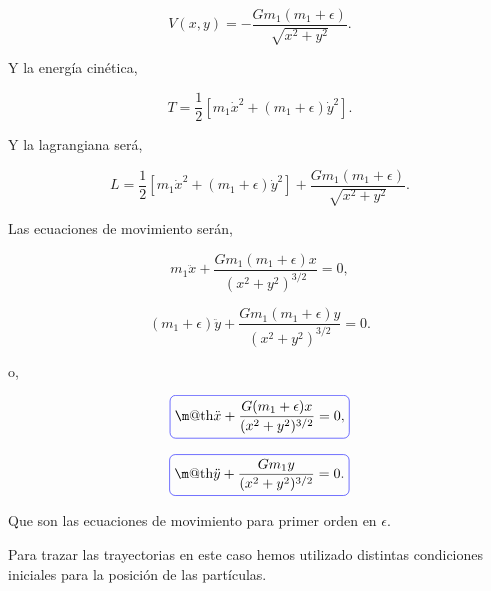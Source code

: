 \documentclass[a4paper,10pt]{article}
\makeatletter
\numberwithin{equation}{section}
\newcommand*{\boxcolor}{blue}
\renewcommand{\boxed}[1]{\textcolor{\boxcolor}{%
\tikz[baseline={([yshift=-1ex]current bounding box.center)}] \node [rectangle, minimum width=1ex,rounded corners,draw] {\normalcolor\m@th$\displaystyle#1$};}}
\makeatother
\begin{document}
\begin{equation}
 V(x,y) = - \frac{G m_1 (m_1 + \epsilon)}{\sqrt{x^2+y^2}}. 
\end{equation}

Y la energía cinética,

\begin{equation}
  T = \frac{1}{2} [m_1 \dot{x}^2 +  (m_1+\epsilon) \dot{y}^2].
\end{equation}

Y la lagrangiana será,

\begin{equation}
 L = \frac{1}{2} [m_1 \dot{x}^2 +  (m_1 + \epsilon) \dot{y}^2] + 
 \frac{G m_1 (m_1 + \epsilon)}{\sqrt{x^2+y^2}}.
\end{equation}

Las ecuaciones de movimiento serán,

\begin{equation}
 m_1 \ddot{x} + \frac{G m_1 (m_1 + \epsilon) x}{(x^2+y^2)^{3/2}} = 0,
\end{equation}

\begin{equation}
 (m_1 + \epsilon) \ddot{y} + \frac{G m_1 (m_1 + \epsilon) y}{(x^2+y^2)^{3/2}} = 0.
\end{equation}


o,

\begin{equation}
\boxed{\ddot{x} + \frac{G (m_1 + \epsilon) x}{(x^2+y^2)^{3/2}} = 0,}
\end{equation}

\begin{equation}
 \boxed{\ddot{y} + \frac{G m_1 y}{(x^2+y^2)^{3/2}} = 0.}
\end{equation}

Que son las ecuaciones de movimiento para primer orden en $\epsilon$.

\vspace{.3cm}

Para trazar las trayectorias en este caso hemos utilizado distintas condiciones iniciales
para la posición de las partículas.
\end{document}
